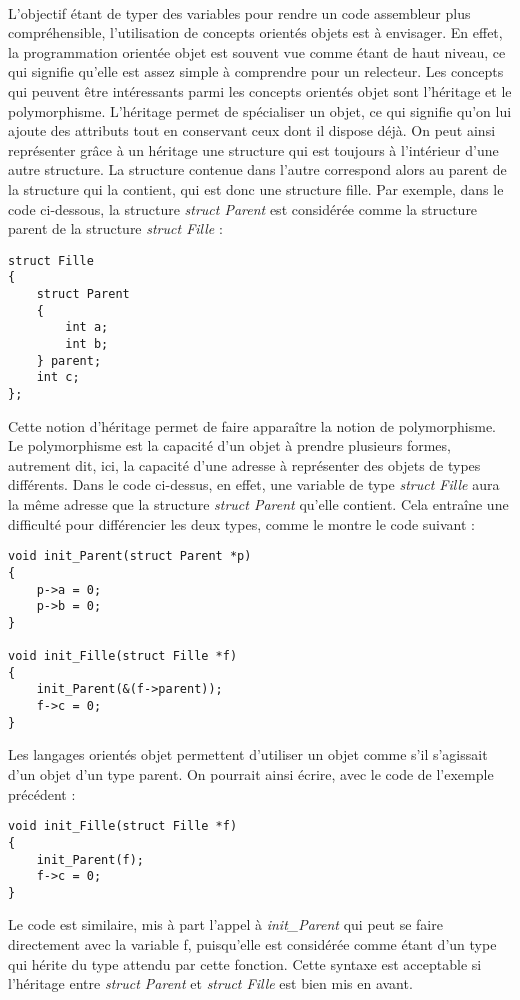\documentclass[a4paper,12pt]{article}
\begin{document}
\paragraph{}
L'objectif étant de typer des variables pour rendre un code assembleur plus
compréhensible, l'utilisation de concepts orientés objets est à envisager.
En effet, la programmation orientée objet est souvent vue comme étant de
haut niveau, ce qui signifie qu'elle est assez simple à comprendre pour un
relecteur. Les concepts qui peuvent être intéressants parmi les concepts
orientés objet sont l'héritage et le polymorphisme.
L'héritage permet de spécialiser un objet, ce qui signifie qu'on lui ajoute
des attributs tout en conservant ceux dont il dispose déjà. On peut ainsi
représenter grâce à un héritage une structure qui est toujours à
l'intérieur d'une autre structure. La structure contenue dans l'autre
correspond alors au parent de la structure qui la contient, qui est donc une
structure fille. Par exemple, dans le code ci-dessous, la structure
\textit{struct Parent} est considérée comme la structure parent de la
structure \textit{struct Fille} :
\begin{lstlisting}
struct Fille
{
	struct Parent
	{
		int a;
		int b;
	} parent;
	int c;
};
\end{lstlisting}
Cette notion d'héritage permet de faire apparaître la notion de
polymorphisme. Le polymorphisme est la capacité d'un objet à prendre
plusieurs formes, autrement dit, ici, la capacité d'une adresse à
représenter des objets de types différents. Dans le code ci-dessus, en 
effet, une variable de type \textit{struct Fille} aura la même adresse
que la structure \textit{struct Parent} qu'elle contient. Cela entraîne 
une difficulté pour différencier les deux types, comme le montre le code
 suivant :
\begin{lstlisting}
void init_Parent(struct Parent *p)
{
	p->a = 0;
	p->b = 0;
}

void init_Fille(struct Fille *f)
{
	init_Parent(&(f->parent));
	f->c = 0;
}
\end{lstlisting}
Les langages orientés objet permettent d'utiliser un objet comme s'il 
s'agissait d'un objet d'un type parent. On pourrait ainsi écrire, avec le
code de l'exemple précédent :
\begin{lstlisting}
void init_Fille(struct Fille *f)
{
	init_Parent(f);
	f->c = 0;
}
\end{lstlisting}
Le code est similaire, mis à part l'appel à \textit{init\_Parent} qui peut
se faire directement avec la variable f, puisqu'elle est considérée comme
étant d'un type qui hérite du type attendu par cette fonction. Cette syntaxe
est acceptable si l'héritage entre \textit{struct Parent} et \textit{struct
Fille} est bien mis en avant.
\end{document}
